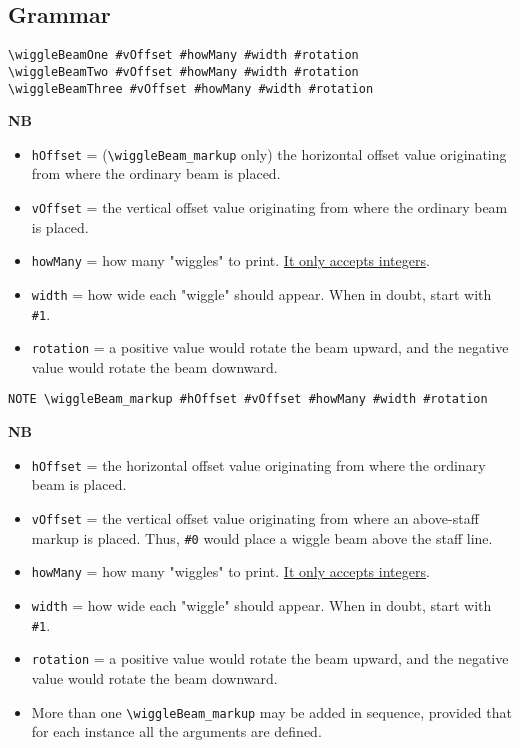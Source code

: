 \subsection{Grammar}
\begin{verbatim}
\wiggleBeamOne #vOffset #howMany #width #rotation 
\wiggleBeamTwo #vOffset #howMany #width #rotation 
\wiggleBeamThree #vOffset #howMany #width #rotation 
\end{verbatim}
\textbf{NB} 
\begin{itemize}
\item \verb|hOffset| = (\verb|\wiggleBeam_markup| only) the horizontal offset value originating from where the ordinary beam is placed. 
\item \verb|vOffset| = the vertical offset value originating from where the ordinary beam is placed. 
\item \verb|howMany| = how many "wiggles" to print. \underline{It only accepts integers}.
\item \verb|width| = how wide each "wiggle" should appear. When in doubt, start with \verb|#1|. 
\item \verb|rotation| = a positive value would rotate the beam upward, and the negative value would rotate the beam downward.
\end{itemize}
\hrulefill
\begin{verbatim}
NOTE \wiggleBeam_markup #hOffset #vOffset #howMany #width #rotation 
\end{verbatim}
\textbf{NB} 
\begin{itemize}
\item \verb|hOffset| = the horizontal offset value originating from where the ordinary beam is placed. 
\item \verb|vOffset| = the vertical offset value originating from where an above-staff markup is placed. Thus, \verb|#0| would place a wiggle beam above the staff line. 
\item \verb|howMany| = how many "wiggles" to print. \underline{It only accepts integers}.
\item \verb|width| = how wide each "wiggle" should appear. When in doubt, start with \verb|#1|. 
\item \verb|rotation| = a positive value would rotate the beam upward, and the negative value would rotate the beam downward.
\item More than one \verb|\wiggleBeam_markup| may be added in sequence, provided that for each instance all the arguments are defined.
\end{itemize}

